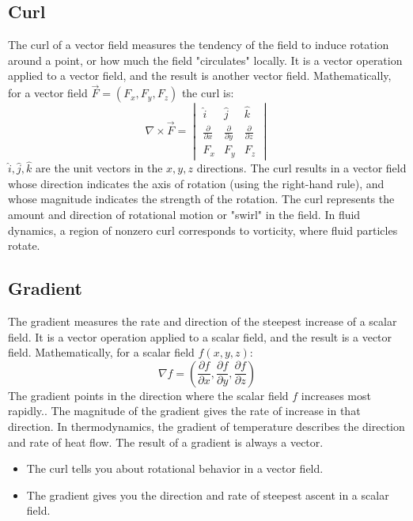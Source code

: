 \subsection{Curl}
The curl of a vector field measures the tendency of the field to induce rotation around a point, or how much the field "circulates" locally. It is a vector operation applied to a vector field, and the result is another vector field. Mathematically, for a vector field $\vec{F}=(F_x, F_y, F_z)$ the curl is:
$$\nabla\times \vec{F}=\begin{vmatrix}
		\hat{i}                     & \hat{j}                     & \hat{k}                     \\
		\frac{\partial}{\partial x} & \frac{\partial}{\partial y} & \frac{\partial}{\partial z} \\
		F_x                         & F_y                         & F_z
	\end{vmatrix}$$
$\hat{i}, \hat{j}, \hat{k}$ are the unit vectors in the $x,y,z$ directions.
The curl results in a vector field whose direction indicates the axis of rotation (using the right-hand rule), and whose magnitude indicates the strength of the rotation.  The curl represents the amount and direction of rotational motion or "swirl" in the field. In fluid dynamics, a region of nonzero curl corresponds to vorticity, where fluid particles rotate.
\subsection{Gradient}
The gradient measures the rate and direction of the steepest increase of a scalar field. It is a vector operation applied to a scalar field, and the result is a vector field. Mathematically, for a scalar field $f(x,y,z)$:
$$\nabla f=\left(\frac{\partial f}{\partial x}, \frac{\partial f}{\partial y}, \frac{\partial f}{\partial z}\right)$$
The gradient points in the direction where the scalar field $f$ increases most rapidly.. The magnitude of the gradient gives the rate of increase in that direction. In thermodynamics, the gradient of temperature describes the direction and rate of heat flow. The result of a gradient is always a vector.
\begin{itemize}
	\item The curl tells you about rotational behavior in a vector field.
	\item The gradient gives you the direction and rate of steepest ascent in a scalar field.
\end{itemize}
